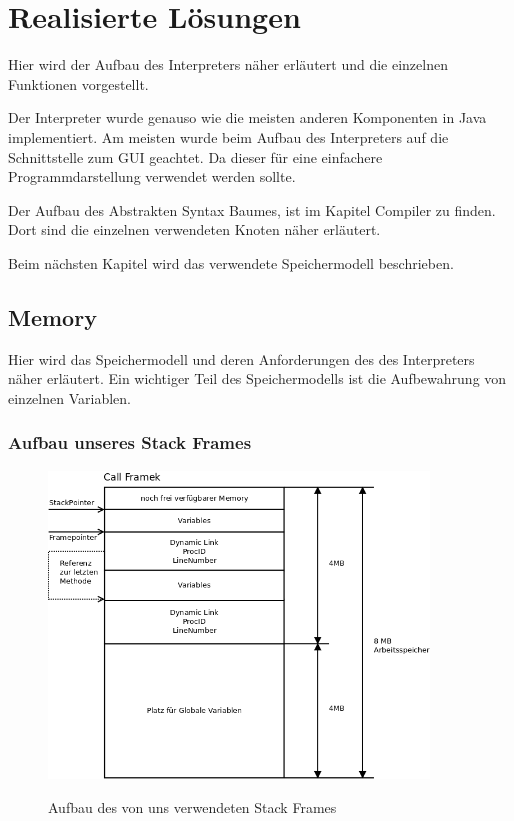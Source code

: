 \section{Realisierte Lösungen}
Hier wird der Aufbau des Interpreters näher erläutert und die einzelnen Funktionen vorgestellt.

Der Interpreter wurde genauso wie die meisten anderen Komponenten in Java implementiert.
Am meisten wurde beim Aufbau des Interpreters auf die Schnittstelle zum GUI geachtet. Da dieser für eine einfachere
Programmdarstellung verwendet werden sollte.

Der Aufbau des Abstrakten Syntax Baumes, ist im Kapitel Compiler zu finden. Dort sind die einzelnen verwendeten 
Knoten näher erläutert.

Beim nächsten Kapitel wird das verwendete Speichermodell beschrieben.

\subsection{Memory}
Hier wird das Speichermodell und deren Anforderungen des des Interpreters näher erläutert.
Ein wichtiger Teil des Speichermodells ist die Aufbewahrung von einzelnen Variablen.

\subsubsection{Aufbau unseres Stack Frames}
\begin{figure}[Stack Frame]
\begin{center}
\includegraphics[width=0.9\textwidth]{./media/images/interpreter/memory/stackframe.png}
\label{fig:stackframe1} 
\caption{Aufbau des von uns verwendeten Stack Frames}
\end{center}
\end{figure}

